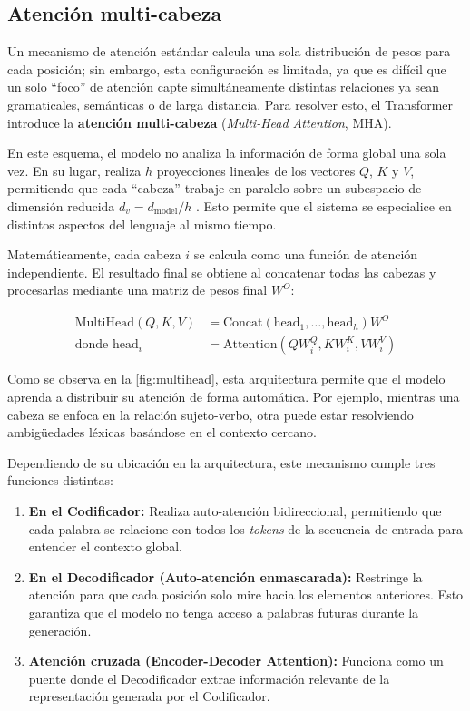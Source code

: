 \documentclass[12pt,a4paper]{report}
\begin{document}
\subsection{Atención multi-cabeza}
\label{subsec:multihead}

Un mecanismo de atención estándar calcula una sola distribución de pesos para cada posición; sin embargo, esta configuración es limitada, ya que es difícil que un solo ``foco'' de atención capte simultáneamente distintas relaciones ya sean gramaticales, semánticas o de larga distancia. Para resolver esto, el Transformer introduce la \textbf{atención multi-cabeza} (\textit{Multi-Head Attention}, MHA).

En este esquema, el modelo no analiza la información de forma global una sola vez. En su lugar, realiza $h$ proyecciones lineales de los vectores $Q$, $K$ y $V$, permitiendo que cada ``cabeza'' trabaje en paralelo sobre un subespacio de dimensión reducida $d_v = d_{\mathrm{model}}/h$ \cite{vaswani_attention_2017}. Esto permite que el sistema se especialice en distintos aspectos del lenguaje al mismo tiempo.

Matemáticamente, cada cabeza $i$ se calcula como una función de atención independiente. El resultado final se obtiene al concatenar todas las cabezas y procesarlas mediante una matriz de pesos final $W^O$:

\begin{align}
\text{MultiHead}(Q, K, V) &= \text{Concat}(\text{head}_1, \ldots, \text{head}_h)W^O \\[0.8em]
\text{donde } \text{head}_i &= \text{Attention}(QW_i^Q, KW_i^K, VW_i^V)
\end{align}

Como se observa en la \autoref{fig:multihead}, esta arquitectura permite que el modelo aprenda a distribuir su atención de forma automática. Por ejemplo, mientras una cabeza se enfoca en la relación sujeto-verbo, otra puede estar resolviendo ambigüedades léxicas basándose en el contexto cercano.

Dependiendo de su ubicación en la arquitectura, este mecanismo cumple tres funciones distintas:

\begin{enumerate}
    \item \textbf{En el Codificador:} Realiza auto-atención bidireccional, permitiendo que cada palabra se relacione con todos los \textit{tokens} de la secuencia de entrada para entender el contexto global.
    \item \textbf{En el Decodificador (Auto-atención enmascarada):} Restringe la atención para que cada posición solo mire hacia los elementos anteriores. Esto garantiza que el modelo no tenga acceso a palabras futuras durante la generación.
    \item \textbf{Atención cruzada (Encoder-Decoder Attention):} Funciona como un puente donde el Decodificador extrae información relevante de la representación generada por el Codificador.
\end{enumerate}
\end{document}
